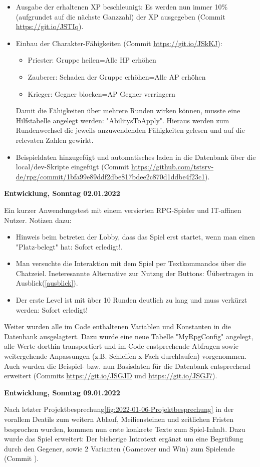 \begin{itemize}
    \item Ausgabe der erhaltenen XP beschleunigt: Es werden nun immer 10\% (aufgrundet auf die nächste Ganzzahl) der XP ausgegeben (Commit \url{https://git.io/JSTIq}).
    \item Einbau der Charakter-Fähigkeiten (Commit \url{https://git.io/JSkKJ}):
    \begin{itemize}
        \item Priester: Gruppe heilen=Alle HP erhöhen
        \item Zauberer: Schaden der Gruppe erhöhen=Alle AP erhöhen
        \item Krieger: Gegner blocken=AP Gegner verringern
    \end{itemize} 
    Damit die Fähigkeiten über mehrere Runden wirken können, musste eine Hilfstabelle angelegt werden: "AbilitysToApply". Hieraus werden zum Rundenwechsel die jeweils anzuwendenden Fähigkeiten gelesen und auf die relevaten Zahlen gewirkt. 
    \item Beispieldaten hinzugefügt und automatisches laden in die Datenbank über die local/dev-Skripte eingefügt (Commit \url{https://github.com/tstsrv-de/rpg/commit/1bfa99e89ddf2dbe817bdee2c870d1ddbe4f23c1}).
\end{itemize} 


\textbf{Entwicklung, Sonntag 02.01.2022}

Ein kurzer Anwendungstest mit einem versierten RPG-Spieler und IT-affinen Nutzer. Notizen dazu: 

\begin{itemize}
    \item Hinweis beim betreten der Lobby, dass das Spiel erst startet, wenn man einen "Platz-belegt" hat: Sofort erledigt!. 
    \item Man versuchte die Interaktion mit dem Spiel per Textkommandos über die Chatzeiel. Ineteresannte Alternative zur Nutzng der Buttons: Üübertragen in Ausblick(\ref{ausblick}). 
    \item Der erste Level ist mit über 10 Runden deutlich zu lang und muss verkürzt werden: Sofort erledigt!
\end{itemize}

Weiter wurden alle im Code enthaltenen Variablen und Konstanten in die Datenbank ausgelagtert. Dazu wurde eine neue Tabelle "MyRpgConfig" angelegt, alle Werte dorthin transportiert und im Code enstprechende Abfragen sowie weitergehende Anpassungen (z.B. Schleifen x-Fach durchlaufen) vorgenommen. Auch wurden die Beispiel- bzw. nun Basisdaten für die Datenbank entsprechend erweitert (Commits \url{https://git.io/JSGJD} und \url{https://git.io/JSGJ7}).


\textbf{Entwicklung, Sonntag 09.01.2022}

Nach letzter Projektbesprechung\ref{fig:2022-01-06-Projektbesprechung} in der vorallem Deatils zum weitern Ablauf, Meiliensteinen und zeitlichen Fristen besprochen wurden, kommen nun erste konkrete Texte zum Spiel-Inhalt. Dazu wurde das Spiel erweitert: Der bisherige Introtext ergänzt um eine Begrüßung durch den Gegener, sowie 2 Varianten (Gameover und Win) zum Spielende (Commit \url{}).


